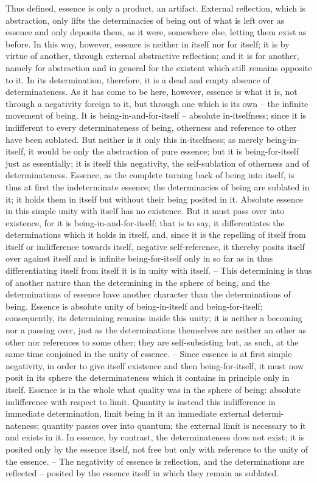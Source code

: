 \documentclass{article}
\begin{document}
Thus defined, essence is only a product, an artifact. External reflection,
which is abstraction, only lifts the determinacies of being out of what is left
over as essence and only deposits them, as it were, somewhere else, letting
them exist as before. In this way, however, essence is neither in itself nor for
itself; it is by virtue of another, through external abstractive reflection; and it
is for another, namely for abstraction and in general for the existent which
still remains opposite to it. In its determination, therefore, it is a dead and
empty absence of determinateness.
As it has come to be here, however, essence is what it is, not through
a negativity foreign to it, but through one which is its own – the infinite
movement of being. It is being-in-and-for-itself – absolute in-itselfness; since
it is indifferent to every determinateness of being, otherness and reference
to other have been sublated. But neither is it only this in-itselfness; as
merely being-in-itself, it would be only the abstraction of pure essence;
but it is being-for-itself just as essentially; it is itself this negativity, the
self-sublation of otherness and of determinateness.
Essence, as the complete turning back of being into itself, is thus at first
the indeterminate essence; the determinacies of being are sublated in it; it
holds them in itself but without their being posited in it. Absolute essence
in this simple unity with itself has no existence. But it must pass over into
existence, for it is being-in-and-for-itself; that is to say, it differentiates the
determinations which it holds in itself, and, since it is the repelling of itself
from itself or indifference towards itself, negative self-reference, it thereby
posits itself over against itself and is infinite being-for-itself only in so far
as in thus differentiating itself from itself it is in unity with itself. – This
determining is thus of another nature than the determining in the sphere of
being, and the determinations of essence have another character than the
determinations of being. Essence is absolute unity of being-in-itself and
being-for-itself; consequently, its determining remains inside this unity;
it is neither a becoming nor a passing over, just as the determinations
themselves are neither an other as other nor references to some other; they
are self-subsisting but, as such, at the same time conjoined in the unity
of essence. – Since essence is at first simple negativity, in order to give
itself existence and then being-for-itself, it must now posit in its sphere the
determinateness which it contains in principle only in itself.
Essence is in the whole what quality was in the sphere of being: absolute
indifference with respect to limit. Quantity is instead this indifference in
immediate determination, limit being in it an immediate external determi-
nateness; quantity passes over into quantum; the external limit is necessary
to it and exists in it. In essence, by contrast, the determinateness does not
exist; it is posited only by the essence itself, not free but only with reference
to the unity of the essence. – The negativity of essence is reflection, and the
determinations are reflected – posited by the essence itself in which they
remain as sublated.
\end{document}
